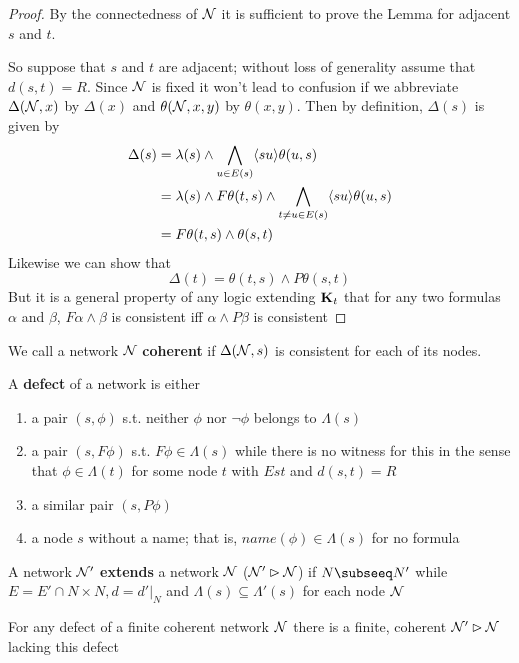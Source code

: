 \documentclass[11pt]{article}
\begin{document}
\begin{proof}
By the connectedness of \(\mathcal{N}\) it is sufficient to prove the Lemma for
adjacent \(s\) and \(t\).

So suppose that \(s\) and \(t\) are adjacent; without loss of generality
assume that \(d(s,t)=R\). Since \(\mathcal{N}\) is fixed it won't lead to confusion
if we abbreviate \(\Delta(\mathcal{N},x)\) by \(\Delta(x)\) and \(\theta(\mathcal{N},x,y)\) by
\(\theta(x,y)\). Then by definition, \(\Delta(s)\) is given by
\begin{align*}
\Delta(s)&=\lambda(s)\wedge\bigwedge_{u\in E(s)}\langle su\rangle\theta(u,s)\\
&=\lambda(s)\wedge F\theta(t,s)\wedge\bigwedge_{t\neq u\in E(s)}\langle su\rangle\theta(u,s)\\
&=F\theta(t,s)\wedge\theta(s,t)
\end{align*}
Likewise we can show that
\begin{equation*}
\Delta(t)=\theta(t,s)\wedge P\theta(s,t)
\end{equation*}
But it is a general property of any logic extending \(\operatorname{\textbf{K}}_t\) that for any
two formulas \(\alpha\) and \(\beta\), \(F\alpha\wedge\beta\) is consistent iff \(\alpha\wedge
   P\beta\) is consistent
\end{proof}

We call a network \(\mathcal{N}\) \textbf{coherent} if \(\Delta(\mathcal{N},s)\) is consistent for each
of its nodes.

A \textbf{defect} of a network is either
\begin{enumerate}
\item a pair \((s,\phi)\) s.t. neither \(\phi\) nor \(\neg\phi\) belongs to \(\Lambda(s)\)
\item a pair \((s,F\phi)\) s.t.  \(F\phi\in\Lambda(s)\) while there is no
witness for this in the sense that \(\phi\in\Lambda(t)\) for some node
\(t\) with \(Est\) and \(d(s,t)=R\)
\item a similar pair \((s,P\phi)\)
\item a node \(s\) without a name; that is, \(name(\phi)\in\Lambda(s)\) for no formula
\end{enumerate}


A network \(\mathcal{N}'\) \textbf{extends} a network \(\mathcal{N}\) (\(\mathcal{N}'\rhd\mathcal{N}\)) if
\(N\subseeq N'\) while \(E=E'\cap N\times N,d=d'\vert_N\) and
\(\Lambda(s)\subseteq\Lambda'(s)\) for each node \(\mathcal{N}\)

\begin{lemma}[]
For any defect of a finite coherent network \(\mathcal{N}\) there is a finite,
coherent \(\mathcal{N}'\rhd\mathcal{N}\) lacking this defect
\end{lemma}
\end{document}
